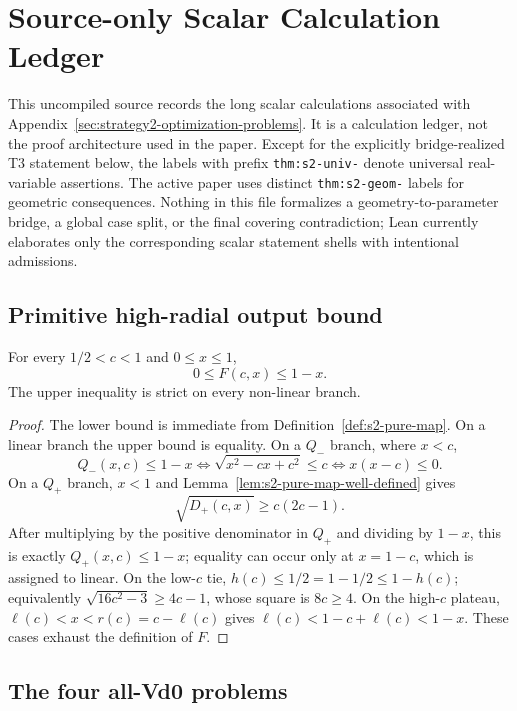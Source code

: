 \section{Source-only Scalar Calculation Ledger}
\label{sec:strategy2-pure-theorems}

This uncompiled source records the long scalar calculations associated with
Appendix~\ref{sec:strategy2-optimization-problems}.  It is a calculation
ledger, not the proof architecture used in the paper.  Except for the
explicitly bridge-realized T3 statement below, the labels with prefix
\texttt{thm:s2-univ-} denote universal real-variable assertions.  The active
paper uses distinct \texttt{thm:s2-geom-} labels for geometric consequences.
Nothing in this file formalizes a geometry-to-parameter bridge, a global case
split, or the final covering contradiction; Lean currently elaborates only
the corresponding scalar statement shells with intentional admissions.

\subsection{Primitive high-radial output bound}

\begin{lemma}
\label{lem:s2-pure-cap}
For every $1/2<c<1$ and $0\le x\le1$,
\[
 0\le F(c,x)\le1-x.
\]
The upper inequality is strict on every non-linear branch.
\end{lemma}

\begin{proof}
The lower bound is immediate from Definition~\ref{def:s2-pure-map}.  On a
linear branch the upper bound is equality.  On a $Q_-$ branch, where $x<c$,
\[
 Q_-(x,c)\le1-x
 \iff
 \sqrt{x^2-cx+c^2}\le c
 \iff x(x-c)\le0.
\]
On a $Q_+$ branch, $x<1$ and Lemma~\ref{lem:s2-pure-map-well-defined} gives
\[
 \sqrt{D_+(c,x)}\ge c(2c-1).
\]
After multiplying by the positive denominator in $Q_+$ and dividing by
$1-x$, this is exactly $Q_+(x,c)\le1-x$; equality can occur only at
$x=1-c$, which is assigned to linear.  On the low-$c$ tie,
$h(c)\le1/2=1-1/2\le1-h(c)$; equivalently
$\sqrt{16c^2-3}\ge4c-1$, whose square is $8c\ge4$.  On the high-$c$
plateau, $\ell(c)<x<r(c)=c-\ell(c)$ gives
$\ell(c)<1-c+\ell(c)<1-x$.  These cases exhaust the definition of $F$.
\end{proof}

\subsection{The four all-Vd0 problems}

